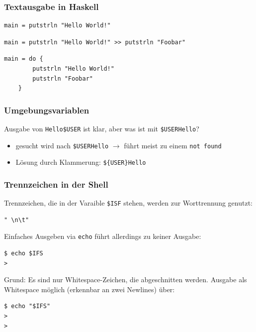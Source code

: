 


	\subsubsection*{Textausgabe in Haskell} %
	\label{ssub:textausgabe_in_haskell}
	
		\lstHaskell
		\begin{lstlisting}
main = putstrln "Hello World!"
		\end{lstlisting}

		\begin{lstlisting}
main = putstrln "Hello World!" >> putstrln "Foobar"
		\end{lstlisting}

		\begin{lstlisting}
main = do {
		putstrln "Hello World!"
		putstrln "Foobar"
	}
		\end{lstlisting}


	\subsubsection*{Umgebungsvariablen} %
	\label{ssub:umgebungsvariablen}

		Ausgabe von \texttt{Hello\$USER} ist klar, aber was ist mit \texttt{\$USERHello}?
		\begin{itemize}
			\item gesucht wird nach \texttt{\$USERHello} $\rightarrow$ führt meist zu einem \texttt{not found}
			\item Lösung durch Klammerung: \texttt{\$\{USER\}Hello}
		\end{itemize}


	\subsubsection*{Trennzeichen in der Shell} %
	\label{ssub:trennzeichen_in_der_shell}
	
		Trennzeichen, die in der Varaible \texttt{\$ISF} stehen, werden zur Worttrennung genutzt:
		\lstShell
		\begin{lstlisting}
" \n\t"
		\end{lstlisting}
		Einfaches Ausgeben via \texttt{echo} führt allerdings zu keiner Ausgabe:
		\lstShell
		\begin{lstlisting}
$ echo $IFS
>
		\end{lstlisting}
		Grund: Es sind nur Whitespace-Zeichen, die abgeschnitten werden. Ausgabe als Whitespace möglich (erkennbar an zwei Newlines) über:
		\lstShell
		\begin{lstlisting}
$ echo "$IFS"
>
>
		\end{lstlisting}

